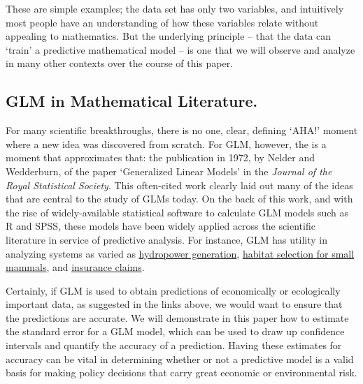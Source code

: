 \documentclass[12pt]{article}
\begin{document}
These are simple examples; the data set has only two variables, and intuitively most people have an understanding of how these variables relate 
without appealing to mathematics.  But the underlying principle -- that the data can `train' a predictive mathematical model -- is one that we will
observe and analyze in many other contexts over the course of this paper.


	\subsection{GLM in Mathematical Literature.}
		For many scientific breakthroughs, there is no one, clear, defining `AHA!' moment where a new idea was discovered from scratch. For
GLM, however, the is a moment that approximates that: the publication in 1972, by Nelder and Wedderburn, of the paper `Generalized Linear Models'
in the \textit{Journal of the Royal Statistical Society}.  This often-cited work clearly laid out many of the ideas that are central to the study 
of GLMs today.  On the back of this work, and with the rise of widely-available statistical software to calculate GLM models such as R and SPSS, 
these models have been widely applied across the scientific literature in service of predictive analysis.  For instance, GLM has utility in
analyzing systems as varied as 
\href{https://www.sciencedirect.com/science/article/pii/S037877961630222X}{hydropower generation}, 
\href{https://www.sciencedirect.com/science/article/pii/S1470160X17306271}{habitat selection for small mammals}, and 
\href{https://www.sciencedirect.com/science/article/pii/S0167668715303358}{insurance claims}.  

Certainly, if GLM is used to obtain predictions of economically or ecologically important data, as suggested in the links above, we would want to 
ensure that the predictions are accurate. We will demonstrate in this paper how to estimate the standard error for a GLM model, which can be 
used to draw up confidence intervals and quantify the accuracy of a prediction.  Having these estimates for accuracy can be vital in determining
whether or not a predictive model is a valid basis for making policy decisions that carry great economic or environmental risk.

\end{document}
